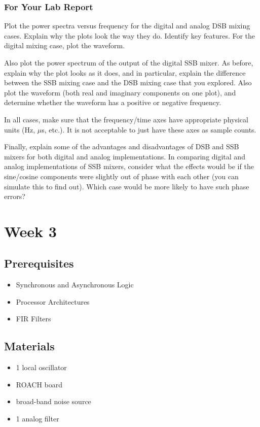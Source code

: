 \documentclass[11pt]{article}
\begin{document}
\subsubsection{For Your Lab Report}

        Plot the power spectra versus
frequency for the digital and analog DSB mixing cases. Explain why the plots look the way they do.  Identify
key features.  For the digital mixing case, plot the waveform.

Also plot the power spectrum of the output of the digital SSB mixer.  As before, explain why the plot
looks as it does, and in particular, explain the difference between the SSB mixing case and the DSB mixing
case that you explored.  Also plot the waveform (both real and imaginary components on one plot), and determine
whether the waveform has a positive or negative frequency.

In all cases, make sure that the frequency/time axes have appropriate physical units (Hz, $\mu$s, etc.).
It is not acceptable to just have these axes as sample counts.

Finally, explain some of the advantages and disadvantages of DSB and SSB mixers for both digital and
analog implementations.  In comparing digital and analog implementations of SSB mixers, consider what the effects would
be if the sine/cosine components were slightly out of phase with each other (you can simulate this to find out).  Which
case would be more likely to have such phase errors?

\section{Week 3}
\subsection*{Prerequisites}

\begin{itemize}[noitemsep,nolistsep]
\item Synchronous and Asynchronous Logic
\item Processor Architectures
\item FIR Filters
\end{itemize}

\subsection*{Materials}

\begin{itemize}[noitemsep,nolistsep]
\item 1 local oscillator
\item ROACH board
\item broad-band noise source
\item 1 analog filter
\end{itemize}
\end{document}
